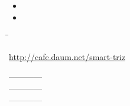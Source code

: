\documentclass[12pt,a4paper,oneside]{book}
\begin{document}
		
		\begin{minipage}[t]{0.2\textwidth}
		\end{minipage}

				
		\begin{minipage}[t]{0.2\textwidth}
			\begin{itemize}[topsep=-1.0em, leftmargin=1.0em, itemsep=-0.5em]
			\item	
			\item	
			\end{itemize}
		\end{minipage}
		
		
		\begin{tabbing}
			\hspace{2cm}\= \hspace{2cm}\= \hspace{2cm}\kill
		\end{tabbing}



		\newpage
%			


		
		\url{http://cafe.daum.net/smart-triz}
		
		
		
%		
				
%		
		

		\hspace{2cm} ------------ \\
		\hspace*{4cm} ------------ \\
		\hspace*{6cm} ------------ \\
		
\end{document}
